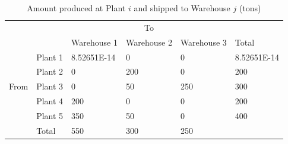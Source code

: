 \documentclass{article}
\begin{document}
\begin{table}[ht]
    \caption{Amount produced at Plant $i$ and shipped to Warehouse $j$ (tons)}
    \centering
    \begin{tabular}{llllll}
        \cline {3-5}
        ~ & \multicolumn{1}{l|}{} & ~ & \multicolumn{1}{c}{To} & \multicolumn{1}{l|}{} & ~ \\ \cline{2-6}
        ~ & \multicolumn{1}{|l|}{} & \multicolumn{1}{l|}{Warehouse 1} & \multicolumn{1}{l|}{Warehouse 2} & \multicolumn{1}{l|}{Warehouse 3} & \multicolumn{1}{l|}{Total} \\ \hline
        \multicolumn{1}{|l|}{} & \multicolumn{1}{l|}{Plant 1} & \multicolumn{1}{l|}{8.52651E-14} & \multicolumn{1}{l|}{0} & \multicolumn{1}{l|}{0} & \multicolumn{1}{l|}{8.52651E-14} \\ \cline{2-6}
        \multicolumn{1}{|l|}{} & \multicolumn{1}{l|}{Plant 2} & \multicolumn{1}{l|}{0} & \multicolumn{1}{l|}{200} & \multicolumn{1}{l|}{0} & \multicolumn{1}{l|}{200} \\ \cline{2-6}
        \multicolumn{1}{|l|}{From} & \multicolumn{1}{l|}{Plant 3} & \multicolumn{1}{l|}{0} & \multicolumn{1}{l|}{50} & \multicolumn{1}{l|}{250} & \multicolumn{1}{l|}{300} \\ \cline{2-6}
        \multicolumn{1}{|l|}{} & \multicolumn{1}{l|}{Plant 4} & \multicolumn{1}{l|}{200} & \multicolumn{1}{l|}{0} & \multicolumn{1}{l|}{0} & \multicolumn{1}{l|}{200} \\ \cline{2-6}
        \multicolumn{1}{|l|}{} & \multicolumn{1}{l|}{Plant 5} & \multicolumn{1}{l|}{350} & \multicolumn{1}{l|}{50} & \multicolumn{1}{l|}{0} & \multicolumn{1}{l|}{400} \\ \hline
        \multicolumn{1}{l|}{} & \multicolumn{1}{l|}{Total} & \multicolumn{1}{l|}{550} & \multicolumn{1}{l|}{300} & \multicolumn{1}{l|}{250} & ~ \\ \cline{2-5}
    \end{tabular}
\end{table}
\end{document}
